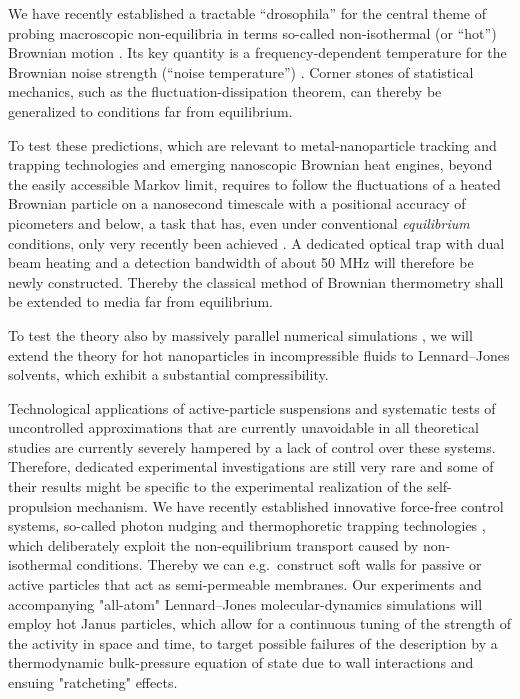 \begin{workpackage}
\begin{tasklist}
\begin{task}[title=Noise Temperature,id=task3,lead=Leipzig,wphases=0-24!0.5]
We have recently established a tractable ``drosophila'' for the central theme of probing 
macroscopic non-equilibria in terms so-called non-isothermal (or ``hot'') Brownian motion \cite{rings-etal:2010}.
%
Its key quantity is a frequency-dependent temperature for the Brownian noise 
strength (``noise temperature'') \cite{falasco-etal:2014}.
%
Corner stones of statistical mechanics, such as the fluctuation-dissipation theorem, can
thereby be generalized to conditions far from equilibrium.  

To test these predictions, which are relevant to metal-nanoparticle tracking and trapping technologies and emerging
nanoscopic Brownian heat engines, beyond the easily accessible Markov limit, requires to follow the fluctuations of 
a heated Brownian particle on a nanosecond timescale with a positional accuracy of picometers and below, a task 
that has, even under conventional \emph{equilibrium} conditions, only very recently been achieved \cite{kheifets-etal:2014}.
%
A dedicated optical trap with dual beam heating and a detection bandwidth of about 50 MHz
will therefore be newly constructed. 
%
Thereby the classical method of Brownian thermometry shall be extended to media far from equilibrium.

To test the theory also by massively parallel numerical simulations \cite{chakraborty-etal:2011}, 
we will extend the theory for hot nanoparticles in incompressible fluids 
to Lennard--Jones solvents, which exhibit a substantial compressibility.
\end{task}

\begin{task}[title=Active-Particle Suspensions,id=task4,lead=Leipzig,wphases=24-48!0.5]
Technological applications of active-particle suspensions and systematic tests of
uncontrolled approximations that are currently unavoidable in all theoretical studies are
currently severely hampered by a lack of control over these systems.
%
Therefore, dedicated experimental investigations are still very rare and some of their
results might be specific to the experimental realization of the self-propulsion mechanism.
%
We have recently established innovative force-free control systems, so-called photon nudging
and thermophoretic trapping technologies \cite{Qian2013,Braun:NanoLetters:2015}, which deliberately exploit 
the non-equilibrium transport caused by non-isothermal conditions.
%
Thereby we can e.g.\ construct soft walls for passive or active particles that act as
semi-permeable membranes.
%
Our experiments and accompanying "all-atom" Lennard--Jones molecular-dynamics simulations \cite{chakraborty-etal:2011} 
will employ hot Janus particles, which allow for a continuous tuning of the strength of 
the activity in space and time, to target 
possible failures of the description by a thermodynamic bulk-pressure equation of
state \cite{ginot-etal:2015} due to wall interactions and ensuing "ratcheting" effects.
\end{task}



\end{tasklist}
\end{workpackage}
